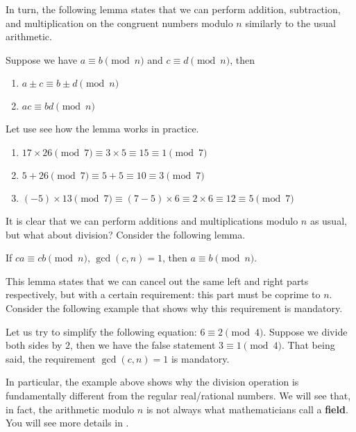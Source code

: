 \documentclass[../lecture-notes-148x210.tex]{subfiles}
\begin{document}
In turn, the following lemma states that we can perform addition, subtraction,
and multiplication on the congruent numbers modulo $n$ similarly to the usual
arithmetic.

\begin{lemma}
    Suppose we have $a \equiv b \pmod{n}$ and $c \equiv d \pmod{n}$, then 
        \begin{enumerate}
            \item $a \pm c \equiv b \pm d \pmod{n}$
            \item $ac \equiv bd \pmod{n}$
        \end{enumerate}
\end{lemma}

\begin{example}
    Let use see how the lemma works in practice.
    \begin{enumerate}
        \item $17 \times 26 \pmod{7} \equiv 3 \times 5 \equiv 15 \equiv 1 \pmod{7}$
        \item $5 + 26 \pmod{7} \equiv 5 + 5 \equiv 10 \equiv 3 \pmod{7}$
        \item $(-5) \times 13 \pmod{7} \equiv (7-5) \times 6 \equiv 2 \times 6 \equiv 12 \equiv 5 \pmod{7}$
    \end{enumerate}
\end{example}

It is clear that we can perform additions and multiplications modulo $n$ as usual, but what 
about division? Consider the following lemma.

\begin{lemma}
    If $ca \equiv cb \pmod{n}$, $\gcd(c, n) = 1$, then $ a \equiv b \pmod{n}$.
\end{lemma}

This lemma states that we can cancel out the same left and right parts
respectively, but with a certain requirement: this part must be coprime to $n$.
Consider the following example that shows why this requirement is mandatory.

\begin{example}
    Let us try to simplify the following equation: $6 \equiv 2 \pmod{4}$. Suppose we 
    divide both sides by $2$, then we have the false statement $3 \equiv 1 \pmod{4}$. 
    That being said, the requirement $\gcd(c, n) = 1$ is mandatory. 
\end{example}

\begin{remark}
    In particular, the example above shows why the division operation is fundamentally 
    different from the regular real/rational numbers. We will see that, in fact, the 
    arithmetic modulo $n$ is not always what mathematicians call a \textbf{field}. 
    You will see more details in .
\end{remark}
\end{document}
